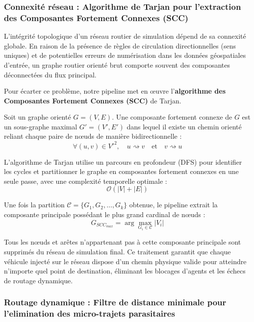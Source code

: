 \documentclass[11pt, a4paper]{article}
\begin{document}
\subsubsection{Connexité réseau : Algorithme de Tarjan pour l'extraction
des Composantes Fortement Connexes
(SCC)}\label{connexituxe9-ruxe9seau-algorithme-de-tarjan-pour-lextraction-des-composantes-fortement-connexes-scc}

L'intégrité topologique d'un réseau routier de simulation dépend de sa
connexité globale. En raison de la présence de règles de circulation
directionnelles (sens uniques) et de potentielles erreurs de
numérisation dans les données géospatiales d'entrée, un graphe routier
orienté brut comporte souvent des composantes déconnectées du flux
principal.

Pour écarter ce problème, notre pipeline met en œuvre
l'\textbf{algorithme des Composantes Fortement Connexes (SCC)} de
Tarjan.

Soit un graphe orienté \(G = (V, E)\). Une composante fortement connexe
de \(G\) est un sous-graphe maximal \(G' = (V', E')\) dans lequel il
existe un chemin orienté reliant chaque paire de nœuds de manière
bidirectionnelle :
\[\forall (u, v) \in V'^2, \quad u \rightsquigarrow v \quad \text{et} \quad v \rightsquigarrow u\]

L'algorithme de Tarjan utilise un parcours en profondeur (DFS) pour
identifier les cycles et partitionner le graphe en composantes fortement
connexes en une seule passe, avec une complexité temporelle optimale :
\[\mathcal{O}(|V| + |E|)\]

Une fois la partition \(\mathcal{C} = \{G_1, G_2, \dots, G_k\}\)
obtenue, le pipeline extrait la composante principale possédant le plus
grand cardinal de nœuds :
\[G_{SCC_{max}} = \arg\max_{G_i \in \mathcal{C}} |V_i|\]

Tous les nœuds et arêtes n'appartenant pas à cette composante principale
sont supprimés du réseau de simulation final. Ce traitement garantit que
chaque véhicule injecté sur le réseau dispose d'un chemin physique
valide pour atteindre n'importe quel point de destination, éliminant les
blocages d'agents et les échecs de routage dynamique.

\subsubsection{Routage dynamique : Filtre de distance minimale pour
l'elimination des micro-trajets
parasitaires}\label{routage-dynamique-filtre-de-distance-minimale-pour-lelimination-des-micro-trajets-parasitaires}
\end{document}
